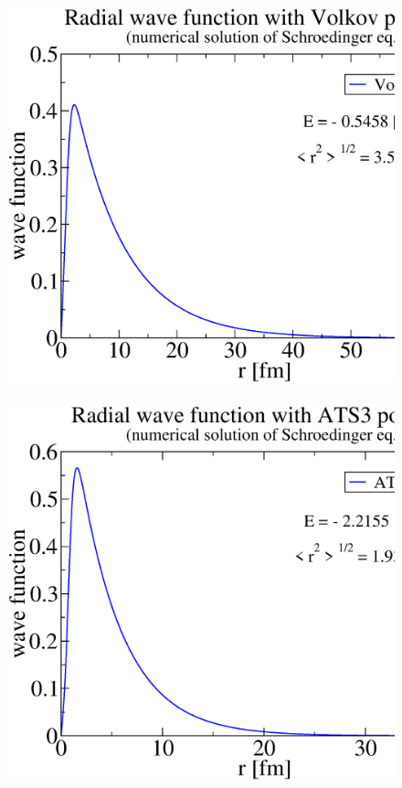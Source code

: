 \documentclass[12pt,a4paper,titlepage]{jarticle}
\begin{document}
\begin{figure}[H]
\begin{center}
\includegraphics[width=140mm,height=110mm]{wf_numeric2.eps}
\end{center}
\end{figure}

\begin{figure}[H]
\begin{center}
\includegraphics[width=140mm,height=110mm]{wf_numeric3.eps}
\end{center}
\end{figure}
\end{document}
